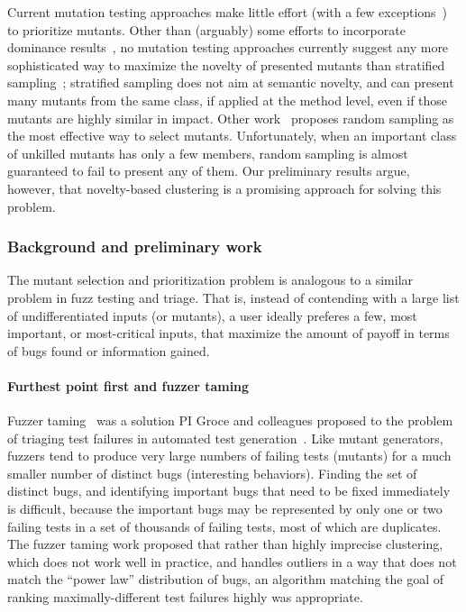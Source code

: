 Current mutation testing approaches make little effort (with a few exceptions~\cite{MutGoogle,FaRM})
to prioritize mutants.  Other than (arguably) some efforts to
incorporate dominance results~\cite{MutQuality}, no mutation testing approaches
currently suggest any more sophisticated way to maximize the novelty of
presented mutants than stratified sampling~\cite{gopinath2017mutation};
stratified sampling does not aim at semantic novelty, and can present many
mutants from the same class, if applied at the method level, even if those
mutants are highly similar in impact.  Other work~\cite{gopinath2015howhard}
proposes random sampling as the most effective way to select mutants.
Unfortunately, when an important class of unkilled mutants has only a few
members, random sampling is almost guaranteed to fail to present any of them.  
Our preliminary results argue, however, that novelty-based clustering is a
promising approach for solving this problem. 

\subsubsection{Background and preliminary work} 

The mutant selection and prioritization problem is analogous to a similar
problem in fuzz testing and triage.  That is, instead of contending with a large
list of undifferentiated inputs (or mutants), a user ideally preferes a few,
most important, or most-critical inputs, that maximize the amount of payoff in
terms of bugs found or information gained.

\paragraph{Furthest point first and fuzzer taming} Fuzzer taming~\cite{PLDI13}
was a solution PI Groce and colleagues proposed to the problem 
of triaging test failures in automated test generation~\cite{SemCrash}.  
Like mutant generators, fuzzers tend to produce very large numbers of failing
tests (mutants) for a much
smaller number of distinct bugs (interesting behaviors).  Finding the set of distinct bugs,
and identifying important bugs that need to be fixed immediately is
difficult, because the important bugs may be represented by only one
or two failing tests in a set of thousands of failing tests, most of
which are duplicates.  The fuzzer taming work proposed that rather than highly imprecise
clustering, which does not work well in practice, and handles outliers
in a way that does not match the ``power law'' distribution of bugs, an
algorithm matching the goal of ranking maximally-different test
failures highly was appropriate. 


